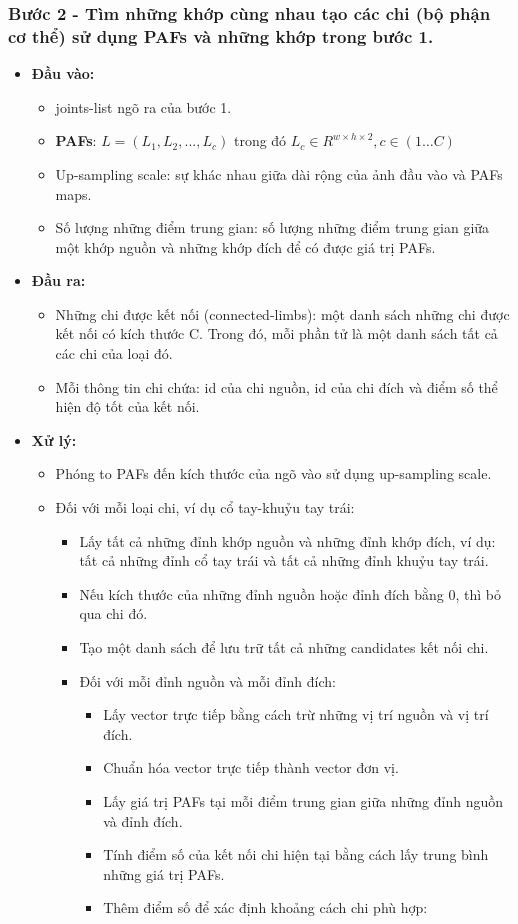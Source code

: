 \subsubsection{Bước 2 - Tìm những khớp cùng nhau tạo các chi (bộ phận cơ thể) sử dụng PAFs và những khớp trong bước 1.}
\begin{itemize}
\item \textbf{Đầu vào:}
	\begin{itemize}
	\item joints-list ngõ ra của bước 1.
	\item \textbf{PAFs}: \textbf{$L = (L_1, L_2, ..., L_c)$} trong đó \textbf{$L_c \in R^{w \times h \times 2},c \in (1 \ldots C)$}
	\item  Up-sampling scale: sự khác nhau giữa dài rộng của ảnh đầu vào và PAFs maps.
	\item Số lượng những điểm trung gian: số lượng những điểm trung gian giữa một khớp nguồn và những khớp đích để có được giá trị PAFs.
	\end{itemize}
\item \textbf{Đầu ra: }
	\begin{itemize}
	\item Những chi được kết nối (connected-limbs): một danh sách những chi được kết nối có kích thước C. Trong đó, mỗi phần tử là một danh sách tất cả các chi của loại đó.
	\item Mỗi thông tin chi chứa: id của chi nguồn, id của chi đích và điểm số thể hiện độ tốt của kết nối.
	\end{itemize}
\item \textbf{Xử lý: }
	\begin{itemize}
	\item  Phóng to PAFs đến kích thước của ngõ vào sử dụng up-sampling scale.
	\item Đối với mỗi loại chi, ví dụ cổ tay-khuỷu tay trái:
		\begin{itemize}
		\item Lấy tất cả những đỉnh khớp nguồn và những đỉnh khớp đích, ví dụ: tất cả những đỉnh cổ tay trái và tất cả những đỉnh khuỷu tay trái.
		\item Nếu kích thước của những đỉnh nguồn hoặc đỉnh đích bằng 0, thì bỏ qua chi đó.
		\item Tạo một danh sách để lưu trữ tất cả những candidates kết nối chi.
		\item Đối với mỗi đỉnh nguồn và mỗi đỉnh đích:
			\begin{itemize}
			\item Lấy vector trực tiếp bằng cách trừ những vị trí nguồn và vị trí đích.
			\item Chuẩn hóa vector trực tiếp thành vector đơn vị.
			\item  Lấy giá trị PAFs tại mỗi điểm trung gian giữa những đỉnh nguồn và đỉnh đích.
			\item Tính điểm số của kết nối chi hiện tại bằng cách lấy trung bình những giá trị PAFs.
			\item Thêm điểm số để xác định khoảng cách chi phù hợp:  
			

\end{itemize}
\end{itemize}
\end{itemize}
\end{itemize}
